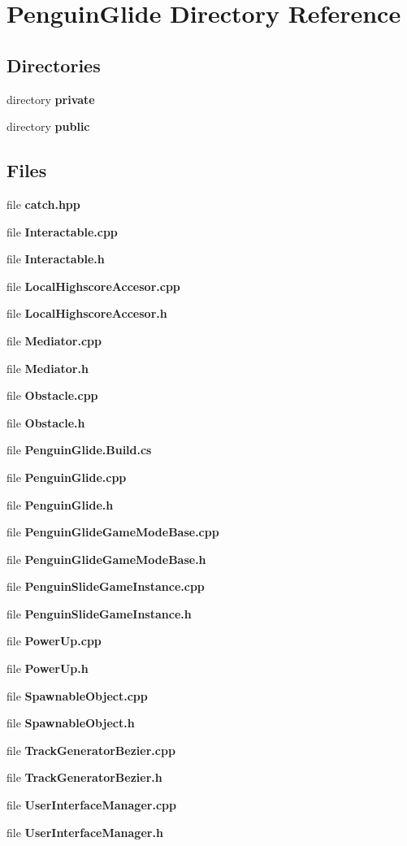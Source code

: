 \section{Penguin\+Glide Directory Reference}
\label{dir_12b3be4042707f2a1ee732e5f87f7a8b}
\subsection*{Directories}
\begin{DoxyCompactItemize}
\item 
directory \textbf{ private}
\item 
directory \textbf{ public}
\end{DoxyCompactItemize}
\subsection*{Files}
\begin{DoxyCompactItemize}
\item 
file \textbf{ catch.\+hpp}
\item 
file \textbf{ Interactable.\+cpp}
\item 
file \textbf{ Interactable.\+h}
\item 
file \textbf{ Local\+Highscore\+Accesor.\+cpp}
\item 
file \textbf{ Local\+Highscore\+Accesor.\+h}
\item 
file \textbf{ Mediator.\+cpp}
\item 
file \textbf{ Mediator.\+h}
\item 
file \textbf{ Obstacle.\+cpp}
\item 
file \textbf{ Obstacle.\+h}
\item 
file \textbf{ Penguin\+Glide.\+Build.\+cs}
\item 
file \textbf{ Penguin\+Glide.\+cpp}
\item 
file \textbf{ Penguin\+Glide.\+h}
\item 
file \textbf{ Penguin\+Glide\+Game\+Mode\+Base.\+cpp}
\item 
file \textbf{ Penguin\+Glide\+Game\+Mode\+Base.\+h}
\item 
file \textbf{ Penguin\+Slide\+Game\+Instance.\+cpp}
\item 
file \textbf{ Penguin\+Slide\+Game\+Instance.\+h}
\item 
file \textbf{ Power\+Up.\+cpp}
\item 
file \textbf{ Power\+Up.\+h}
\item 
file \textbf{ Spawnable\+Object.\+cpp}
\item 
file \textbf{ Spawnable\+Object.\+h}
\item 
file \textbf{ Track\+Generator\+Bezier.\+cpp}
\item 
file \textbf{ Track\+Generator\+Bezier.\+h}
\item 
file \textbf{ User\+Interface\+Manager.\+cpp}
\item 
file \textbf{ User\+Interface\+Manager.\+h}
\end{DoxyCompactItemize}
